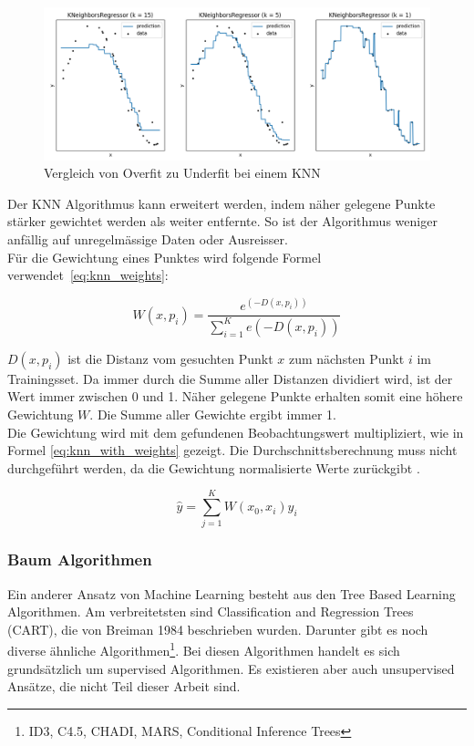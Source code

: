 \begin{figure}[ht]
\centering
\includegraphics[width=\textwidth]{images/knears_overfit.png}
\caption[Vergleich von Overfit zu Underfit bei einem KNN]{Vergleich von Overfit zu Underfit bei einem KNN}
\label{fig:under_overfit_knn}
\end{figure}

Der KNN Algorithmus kann erweitert werden, indem näher gelegene Punkte stärker gewichtet werden als weiter entfernte. So ist der Algorithmus weniger anfällig auf unregelmässige Daten oder Ausreisser.\\
Für die Gewichtung eines Punktes wird folgende Formel verwendet~\eqref{eq:knn_weights}:

\begin{equation}
\label{eq:knn_weights}
W(x, p_i) = \frac{e^{(-D(x, p_i))}}{\sum_{i=1}^{K} e(-D(x, p_i))}
\end{equation}

$D(x, p_i)$ ist die Distanz vom gesuchten Punkt $x$ zum nächsten Punkt $i$ im Trainingsset. Da immer durch die Summe aller Distanzen dividiert wird, ist der Wert immer zwischen 0 und 1. Näher gelegene Punkte erhalten somit eine höhere Gewichtung $W$. Die Summe aller Gewichte ergibt immer 1.\\
Die Gewichtung wird mit dem gefundenen Beobachtungswert multipliziert, wie in Formel \eqref{eq:knn_with_weights} gezeigt. Die Durchschnittsberechnung muss nicht durchgeführt werden, da die Gewichtung normalisierte Werte zurückgibt \cite{knn_2, knn_3}.

\begin{equation}
\label{eq:knn_with_weights}
\hat{y} = \sum_{j=1}^{K} W(x_0, x_i) y_i
\end{equation}

\subsubsection{Baum Algorithmen}
Ein anderer Ansatz von Machine Learning besteht aus den Tree Based Learning Algorithmen. Am verbreitetsten sind Classification and Regression Trees (CART), die von Breiman 1984 beschrieben wurden. Darunter gibt es noch diverse ähnliche Algorithmen\footnote{ID3, C4.5, CHADI, MARS, Conditional Inference Trees}. Bei diesen Algorithmen handelt es sich grundsätzlich um supervised Algorithmen. Es existieren aber auch unsupervised Ansätze, die nicht Teil dieser Arbeit sind.

